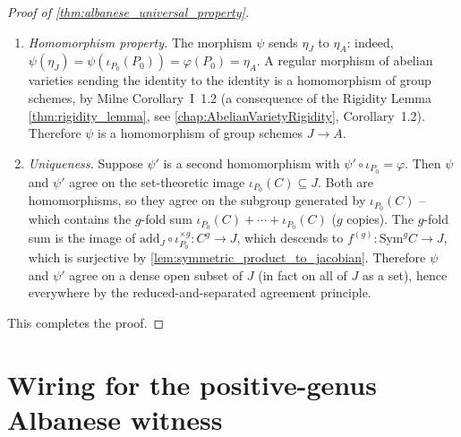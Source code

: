 \begin{proof}[Proof of \cref{thm:albanese_universal_property}]
\begin{enumerate}
      effective divisor \(Q + (g-1) P_0 \in \mathrm{Sym}^g C(\bar k)\)
      (its image under \(f^{(g)}\) in \(J\) is
      \([\mathcal O_C(Q + (g-1) P_0 - g P_0)] = [\mathcal O_C(Q - P_0)]
      = \iota_{P_0}(Q)\), matching \cref{lem:abel_jacobi_morphism}). On
      \(\bar k\)-points,
      \[
        \psi(\iota_{P_0}(Q)) = \widetilde\psi(Q + (g-1) P_0)
          = \varphi(Q) + (g-1)\varphi(P_0) = \varphi(Q),
      \]
      using \(\varphi(P_0) = \eta_A\) and that \(\eta_A\) is the identity of
      \(A\). Hence \(\psi \circ \iota_{P_0} = \varphi\) on \(\bar k\)-points,
      and therefore \(\psi \circ \iota_{P_0} = \varphi\) as morphisms of
      \(\bar k\)-schemes (both sides are regular morphisms \(C \to A\) from
      a reduced separated scheme to a separated scheme, agreeing on
      dense \(\bar k\)-points, hence agreeing everywhere by the
      reduced-and-separated agreement principle).
    \item \emph{Homomorphism property.} The morphism \(\psi\) sends
      \(\eta_J\) to \(\eta_A\): indeed,
      \(\psi(\eta_J) = \psi(\iota_{P_0}(P_0)) = \varphi(P_0) = \eta_A\).
      A regular morphism of abelian varieties sending the identity to
      the identity is a homomorphism of group schemes, by Milne
      Corollary~I~1.2 (a consequence of the Rigidity Lemma
      \cref{thm:rigidity_lemma}, see
      \cref{chap:AbelianVarietyRigidity}, Corollary~1.2). Therefore
      \(\psi\) is a homomorphism of group schemes \(J \to A\).
    \item \emph{Uniqueness.} Suppose \(\psi'\) is a second homomorphism
      with \(\psi' \circ \iota_{P_0} = \varphi\). Then \(\psi\) and
      \(\psi'\) agree on the set-theoretic image \(\iota_{P_0}(C) \subseteq
      J\). Both are homomorphisms, so they agree on the subgroup
      generated by \(\iota_{P_0}(C)\) -- which contains the \(g\)-fold sum
      \(\iota_{P_0}(C) + \cdots + \iota_{P_0}(C)\) (\(g\) copies). The
      \(g\)-fold sum is the image of
      \(\mathrm{add}_J \circ \iota_{P_0}^{\times g} \colon C^g \to J\),
      which descends to \(f^{(g)} \colon \mathrm{Sym}^g C \to J\), which
      is surjective by \cref{lem:symmetric_product_to_jacobian}.
      Therefore \(\psi\) and \(\psi'\) agree on a dense open subset of \(J\)
      (in fact on all of \(J\) as a set), hence everywhere by the
      reduced-and-separated agreement principle.
  \end{enumerate}
  This completes the proof.
\end{proof}

\section{Wiring for the positive-genus Albanese witness}
\label{sec:albaneseup_witness_wiring}

